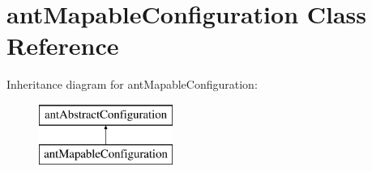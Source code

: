 \hypertarget{classant_mapable_configuration}{\section{ant\+Mapable\+Configuration Class Reference}
\label{classant_mapable_configuration}
}
Inheritance diagram for ant\+Mapable\+Configuration\+:\begin{figure}[H]
\begin{center}
\leavevmode
\includegraphics[height=2.000000cm]{classant_mapable_configuration}
\end{center}
\end{figure}
